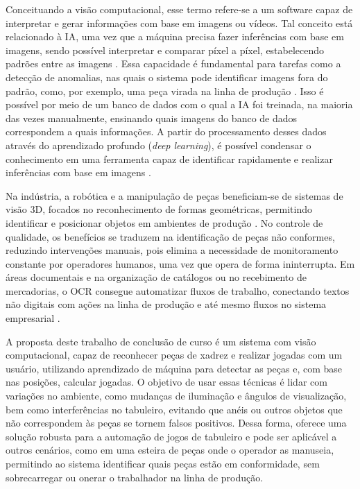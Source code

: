 \documentclass[journal]{IEEEtran} %
\begin{document}
Conceituando a visão computacional, esse termo refere-se a um software capaz de interpretar e gerar informações com base em imagens ou vídeos. Tal conceito está relacionado à IA, uma vez que a máquina precisa fazer inferências com base em imagens, sendo possível interpretar e comparar píxel a píxel, estabelecendo padrões entre as imagens \cite{szeliski2010}. Essa capacidade é fundamental para tarefas como a detecção de anomalias, nas quais o sistema pode identificar imagens fora do padrão, como, por exemplo, uma peça virada na linha de produção \cite{packt2024}. Isso é possível por meio de um banco de dados com o qual a IA foi treinada, na maioria das vezes manualmente, ensinando quais imagens do banco de dados correspondem a quais informações. A partir do processamento desses dados através do aprendizado profundo (\textit{deep learning}), é possível condensar o conhecimento em uma ferramenta capaz de identificar rapidamente e realizar inferências com base em imagens \cite{goodfellow2016}.

Na indústria, a robótica e a manipulação de peças beneficiam-se de sistemas de visão 3D, focados no reconhecimento de formas geométricas, permitindo identificar e posicionar objetos em ambientes de produção \cite{siderurgia_visao_computacional}. No controle de qualidade, os benefícios se traduzem na identificação de peças não conformes, reduzindo intervenções manuais, pois elimina a necessidade de monitoramento constante por operadores humanos, uma vez que opera de forma ininterrupta. Em áreas documentais e na organização de catálogos ou no recebimento de mercadorias, o OCR consegue automatizar fluxos de trabalho, conectando textos não digitais com ações na linha de produção e até mesmo fluxos no sistema empresarial \cite{makewise2024}.

A proposta deste trabalho de conclusão de curso é um sistema com visão computacional, capaz de reconhecer peças de xadrez e realizar jogadas com um usuário, utilizando aprendizado de máquina para detectar as peças e, com base nas posições, calcular jogadas. O objetivo de usar essas técnicas é lidar com variações no ambiente, como mudanças de iluminação e ângulos de visualização, bem como interferências no tabuleiro, evitando que anéis ou outros objetos que não correspondem às peças se tornem falsos positivos. Dessa forma, oferece uma solução robusta para a automação de jogos de tabuleiro e pode ser aplicável a outros cenários, como em uma esteira de peças onde o operador as manuseia, permitindo ao sistema identificar quais peças estão em conformidade, sem sobrecarregar ou onerar o trabalhador na linha de produção.
\end{document}
